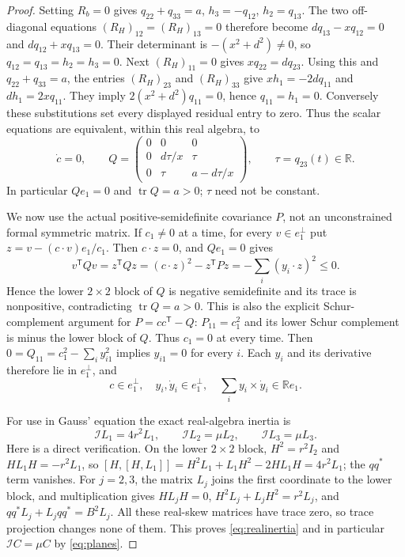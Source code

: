 \documentclass[11pt]{article}
\newcommand{\tr}{\operatorname{tr}}
\begin{document}
\begin{proof}
Setting $R_b=0$ gives $q_{22}+q_{33}=a$, $h_3=-q_{12}$,
$h_2=q_{13}$. The two off-diagonal equations $(R_H)_{12}=
(R_H)_{13}=0$ therefore become
$dq_{13}-xq_{12}=0$ and $dq_{12}+xq_{13}=0$.
Their determinant is $-(x^2+d^2)\ne0$, so
$q_{12}=q_{13}=h_2=h_3=0$.
Next $(R_H)_{11}=0$ gives $xq_{22}=dq_{23}$.
Using this and $q_{22}+q_{33}=a$, the entries $(R_H)_{23}$ and
$(R_H)_{33}$ give
$xh_1=-2dq_{11}$ and $dh_1=2xq_{11}$.
They imply $2(x^2+d^2)q_{11}=0$, hence $q_{11}=h_1=0$.
Conversely these substitutions set every displayed residual entry to
zero. Thus the scalar equations are equivalent, within this real
algebra, to
\begin{equation}\label{eq:Qform}
 \dot c=0,\qquad
 Q=\begin{pmatrix}
 0&0&0\\0&d\tau/x&\tau\\0&\tau&a-d\tau/x
 \end{pmatrix},\qquad \tau=q_{23}(t)\in\mathbb R.
\end{equation}
In particular $Qe_1=0$ and $\tr Q=a>0$; $\tau$ need not be constant.

We now use the actual positive-semidefinite covariance $P$, not an
unconstrained formal symmetric matrix. If $c_1\ne0$ at a time, for every
$v\in e_1^\perp$ put
$z=v-(c\cdot v)e_1/c_1$. Then $c\cdot z=0$, and $Qe_1=0$ gives
\[
 v^{\mathsf T}Qv=z^{\mathsf T}Qz
 =(c\cdot z)^2-z^{\mathsf T}Pz
 =-\sum_i(y_i\cdot z)^2\leq0.
\]
Hence the lower $2\times2$ block of $Q$ is negative semidefinite and
its trace is nonpositive, contradicting $\tr Q=a>0$.
This is also the explicit Schur-complement argument for
$P=cc^{\mathsf T}-Q$: $P_{11}=c_1^2$ and its lower Schur complement
is minus the lower block of $Q$. Thus $c_1=0$ at every time. Then
$0=Q_{11}=c_1^2-\sum_i y_{i1}^2$ implies $y_{i1}=0$ for every $i$.
Each $y_i$ and its derivative therefore lie in $e_1^\perp$, and
\begin{equation}\label{eq:planes}
 c\in e_1^\perp,\quad y_i,\dot y_i\in e_1^\perp,
 \quad\sum_i y_i\times\dot y_i\in\mathbb R e_1.
\end{equation}

For use in Gauss' equation the exact real-algebra inertia is
\begin{equation}\label{eq:realinertia}
 \mathcal I L_1=4r^2L_1,\qquad
 \mathcal I L_2=\mu L_2,\qquad
 \mathcal I L_3=\mu L_3.
\end{equation}
Here is a direct verification. On the lower $2\times2$ block,
$H^2=r^2I_2$ and $HL_1H=-r^2L_1$, so
$[H,[H,L_1]]=H^2L_1+L_1H^2-2HL_1H=4r^2L_1$;
the $qq^*$ term vanishes. For $j=2,3$, the matrix $L_j$ joins the
first coordinate to the lower block, and multiplication gives
$HL_jH=0$, $H^2L_j+L_jH^2=r^2L_j$, and
$qq^*L_j+L_jqq^*=B^2L_j$. All these real-skew matrices have trace zero,
so trace projection changes none of them. This proves
\eqref{eq:realinertia} and in particular $\mathcal I C=\mu C$ by
\eqref{eq:planes}.


\end{proof}
\end{document}
